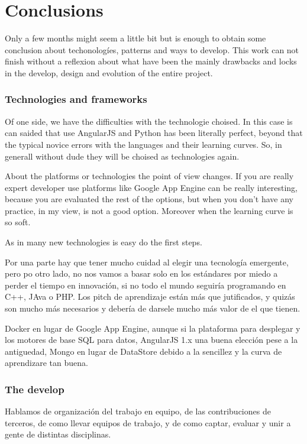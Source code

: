 \chapter{Conclusions}

Only a few months might seem a little bit but  is enough to obtain some
conclusion about techonologíes, patterns and ways to develop.
This work can not finish without a reflexion about what have been the mainly
drawbacks and locks in the develop, design and evolution of the entire project.


\subsection{Technologies and frameworks}

Of one side, we have the difficulties with the technologie choised. In this case
 is can saided that use AngularJS and Python has been literally perfect, beyond
 that the typical novice errors with the languages and their learning curves.
 So, in generall without dude they will be choised as technologies again.

 About the platforms or technologies the point of view changes. If you are
 really expert developer use platforms like Google App Engine can be really
 interesting, because you are evaluated the rest of the options, but when
 you don't have any practice, in my view, is not a good option. Moreover when
 the learning curve is so soft.

 As in many new technologies is easy do the first steps.


 Por una parte hay que tener mucho cuidad al elegir una tecnología emergente,
 pero po otro lado, no nos vamos a basar solo en los estándares por miedo
a perder el tiempo en innovación, si no todo el mundo seguiría programando en
C++, JAva o PHP.
Los pitch de aprendizaje están más que jutificados, y quizás son mucho más necesarios
y debería de darsele mucho más valor de el que tienen.

Docker en lugar de Google App Engine, aunque si la plataforma para desplegar y los motores de base SQL para datos,
AngularJS 1.x una buena elección pese a la antiguedad,  Mongo en lugar de DataStore debido a la
sencillez y la curva de aprendizare tan buena.


\subsection{The develop}

Hablamos de organización del trabajo en equipo, de las contribuciones de terceros,
de como llevar equipos de trabajo, y de como captar, evaluar y unir a gente de
distintas disciplinas.

